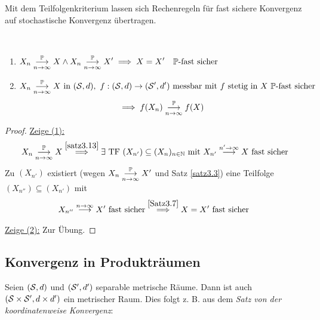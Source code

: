 Mit dem Teilfolgenkriterium lassen sich Rechenregeln für fast sichere Konvergenz auf stochastische Konvergenz übertragen.

\begin{korollar}\label{Korollar3.14}\
	\begin{enumerate}[label=(\arabic*)]
		\item $\begin{aligned}
			X_n
			\stackrelnew{n\to\infty}{\P}{\longrightarrow}
			X\wedge X_n
			\stackrelnew{n\to\infty}{\P}{\longrightarrow}
			X'
			\implies X=X'\quad\P\text{-fast sicher}
		\end{aligned}$
		\item $\begin{aligned}
			X_n
			\stackrelnew{n\to\infty}{\P}{\longrightarrow}
			X\text{ in }(\S,d),~f:(\S,d)\to(\S',d')\text{ messbar mit $f$ stetig in $X$ $\P$-fast sicher }
		\end{aligned}$
		\begin{align*}
			\implies f(X_n)
			\stackrelnew{n\to\infty}{\P}{\longrightarrow}
			f(X)
		\end{align*}
	\end{enumerate}
\end{korollar}

\begin{proof}
	\underline{Zeige (1):}
	\begin{align*}
		X_n
		\stackrelnew{n\to\infty}{\P}{\longrightarrow}
		X
		\stackrel{\ref{satz3.13}}{\implies}
		\exists\text{ TF }(X_{n'})\subseteq(X_n)_{n\in\N}\mit X_{n'}
		\stackrel{n'\to\infty}{\longrightarrow}
		X\text{ fast sicher}
	\end{align*}
	Zu $(X_{n'})$ existiert (wegen $X_n\stackrelnew{n\to\infty}{\P}{\longrightarrow} X'$ und Satz \ref{satz3.3}) eine Teilfolge
	$(X_{n''})\subseteq(X_{n'})$ mit
	\begin{align*}
		X_{n''}
		\stackrel{n\to\infty}{\longrightarrow} X'\text{ fast sicher}
		\stackrel{\ref{Satz3.7}}{\implies}
		X=X'\text{ fast sicher }
	\end{align*}

	\underline{Zeige (2):} Zur Übung.
\end{proof}

\subsection*{Konvergenz in Produkträumen} %
Seien $(\S,d)$ und $(\S',d')$ separable metrische Räume. Dann ist auch $(\S\times\S',d\times d')$ ein metrischer Raum. 
Dies folgt z. B. aus dem \textit{Satz von der koordinatenweise Konvergenz}:

